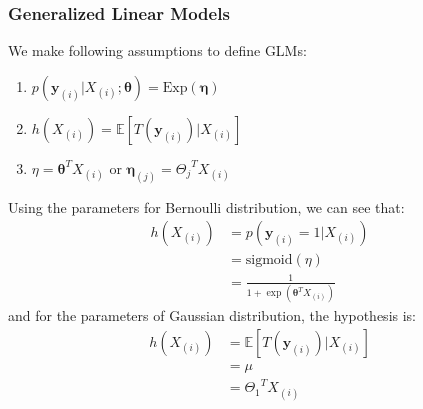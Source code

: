 \documentclass{article}
\renewcommand{\pmb}[1]{\boldsymbol{#1}}
\begin{document}
\subsubsection{Generalized Linear Models}
We make following assumptions to define GLMs: 
\begin{enumerate}
    \item $p(\pmb{y}_{(i)}|X_{(i)}; \pmb\theta) = \text{Exp}(\pmb\eta)$ 
    \item $h(X_{(i)}) = \mathbb{E}[T(\pmb{y}_{(i)}) | X_{(i)}]$
    \item $\eta = \pmb\theta^T X_{(i)}$ or $\pmb\eta_{(j)} = {\Theta_j}^T X_{(i)}$
\end{enumerate}
Using the parameters for Bernoulli distribution, we can see that: 
\begin{align*}
    h(X_{(i)}) &= p(\pmb{y}_{(i)} = 1 | X_{(i)}) \\ 
    &= \text{sigmoid}(\eta) \\ 
    &= \frac{1}{1 + \exp(\pmb\theta^T X_{(i)})} 
\end{align*}
and for the parameters of Gaussian distribution, the hypothesis is:
\begin{align*}
    h(X_{(i)}) &= \mathbb{E}[T(\pmb y_{(i)}) | X_{(i)}] \\ 
    &= \mu \\ 
    &= {\Theta_1}^T X_{(i)}
\end{align*}
\end{document}
